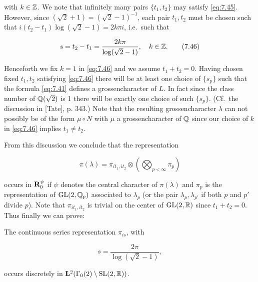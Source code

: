 with $k \in \mathbb{Z}$. We note that infinitely many pairs $\{t_1, t_2\}$ may satisfy \eqref{eq:7.45}. However, since $(\sqrt{2} + 1) = (\sqrt{2} - 1)^{-1}$, each pair $t_1, t_2$ must be chosen such that $i(t_2 - t_1)\log(\sqrt{2} - 1) = 2k\pi i$, i.e.\ such that

\begin{equation}\label{eq:7.46}
s = t_2 - t_1 = \frac{2k\pi}{\log(\sqrt{2} - 1)}, \quad k \in \mathbb{Z}.\tag{7.46}
\end{equation}

Henceforth we fix $k = 1$ in \eqref{eq:7.46} and we assume $t_1 + t_2 = 0$. Having chosen fixed $t_1, t_2$ satisfying \eqref{eq:7.46} there will be at least one choice of $\{s_p\}$ such that the formula \eqref{eq:7.41} defines a grossencharacter of $L$. In fact since the class number of $\mathbb{Q}(\sqrt{2})$ is 1 there will be exactly one choice of such $\{s_p\}$. (Cf.\ the discussion in [Tate], p. 343.) Note that the resulting grossencharacter $\lambda$ can not possibly be of the form $\mu \circ N$ with $\mu$ a grossencharacter of $\mathbb{Q}$ since our choice of $k$ in \eqref{eq:7.46} implies $t_1 \neq t_2$.

From this discussion we conclude that the representation

\begin{equation}\label{eq:7.47}
\pi(\lambda) = \pi_{it_1,it_2} \otimes \left(\bigotimes_{p < \infty} \pi_p\right)\tag{7.47}
\end{equation}

occurs in $\mathbf{R}_0^\psi$ if $\psi$ denotes the central character of $\pi(\lambda)$ and $\pi_p$ is the representation of $\operatorname{GL}(2,\mathbb{Q}_p)$ associated to $\lambda_p$ (or the pair $\lambda_p, \lambda_{p'}$ if both $p$ and $p'$ divide $p$). Note that $\pi_{it_1,it_2}$ is trivial on the center of $\operatorname{GL}(2,\mathbb{R})$ since $t_1 + t_2 = 0$. Thus finally we can prove:

\begin{theorem}\label{thm:7.12}

The continuous series representation $\pi_{is}$, with

\[
s = \frac{2\pi}{\log(\sqrt{2} - 1)},
\]

occurs discretely in $\mathbf{L}^2(\Gamma_0(2)\setminus\operatorname{SL}(2,\mathbb{R}))$.

\end{theorem}

